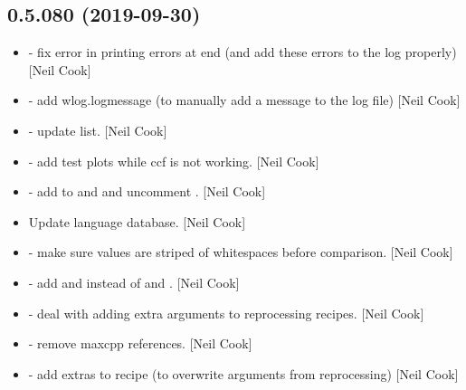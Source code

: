 \documentclass[a4paper,10pt,english]{report}
\begin{document}
\subsection{0.5.080 (2019-09-30)}
\label{\detokenize{misc/changelog:id63}}\begin{itemize}
\item {} 
 - fix error in printing errors at
end (and add these errors to the log properly) {[}Neil Cook{]}

\item {} 
 - add wlog.logmessage (to manually add a message
to the log file) {[}Neil Cook{]}

\item {} 
 - update list. {[}Neil Cook{]}

\item {} 
 - add test plots while ccf is
not working. {[}Neil Cook{]}

\item {} 
 - add  to 
and  and uncomment . {[}Neil Cook{]}

\item {} 
Update language database. {[}Neil Cook{]}

\item {} 
 - make sure values are striped of whitespaces
before comparison. {[}Neil Cook{]}

\item {} 
 - add  and
 instead of  and
. {[}Neil Cook{]}

\item {} 
 - deal with adding extra arguments
to reprocessing recipes. {[}Neil Cook{]}

\item {} 
 - remove maxcpp references. {[}Neil Cook{]}

\item {} 
 - add extras to recipe (to overwrite arguments
from reprocessing) {[}Neil Cook{]}


\end{itemize}
\end{document}
